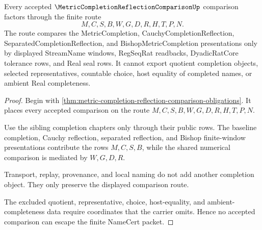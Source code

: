 \begin{theorem}
\label{thm:metric-completion-reflection-comparison-nonescape}
Every accepted $\MetricCompletionReflectionComparisonUp$ comparison factors through the finite route
$$
M,C,S,B,W,G,D,R,H,T,P,N.
$$
The route compares the MetricCompletion, CauchyCompletionReflection, SeparatedCompletionReflection, and BishopMetricCompletion presentations only by displayed StreamName windows, RegSeqRat readbacks, DyadicRatCore tolerance rows, and Real seal rows. It cannot export quotient completion objects, selected representatives, countable choice, host equality of completed names, or ambient Real completeness.
\end{theorem}
\begin{proof}
Begin with \autoref{thm:metric-completion-reflection-comparison-obligations}. It places every accepted comparison on the route $M,C,S,B,W,G,D,R,H,T,P,N$.

Use the sibling completion chapters only through their public rows. The baseline completion, Cauchy reflection, separated reflection, and Bishop finite-window presentations contribute the rows $M,C,S,B$, while the shared numerical comparison is mediated by $W,G,D,R$.

Transport, replay, provenance, and local naming do not add another completion object. They only preserve the displayed comparison route.

The excluded quotient, representative, choice, host-equality, and ambient-completeness data require coordinates that the carrier omits. Hence no accepted comparison can escape the finite NameCert packet.
\end{proof}

\begin{closurestatus}{\MetricCompletionReflectionComparisonUp}
  \theoryclosure{\seedClosure}
  \formalstatus{\unformalizedV}
\end{closurestatus}
